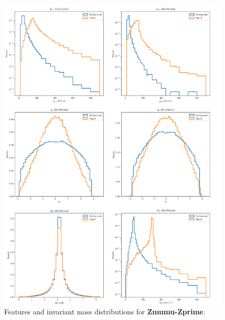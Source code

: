 \begin{figure}
	\centering
	\includegraphics[width=1.0\textwidth]{Python/Z/features_Zmumu_Zprime.pdf}
	\caption{Features and invariant mass distributions for \textbf{Zmumu-Zprime}.}
	\label{fig:Z_PRIME_FEATURES_DISTRIBUTIONS}
\end{figure}

